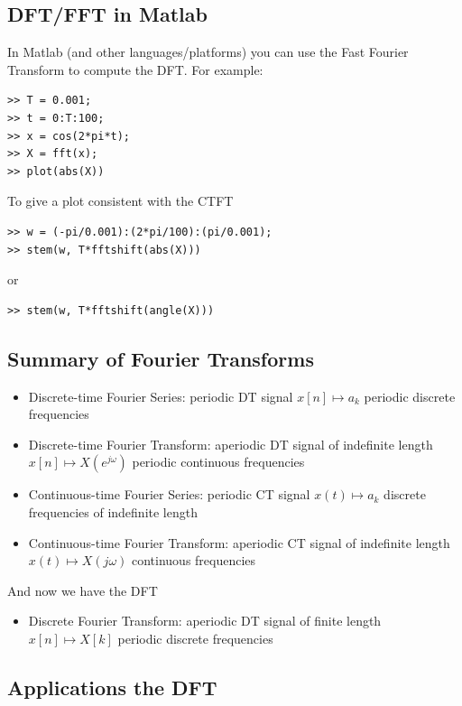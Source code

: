 \subsection{DFT/FFT in Matlab}

In Matlab (and other languages/platforms) you can use the Fast Fourier Transform to compute the DFT. For example:

\begin{verbatim}
>> T = 0.001;
>> t = 0:T:100;
>> x = cos(2*pi*t);
>> X = fft(x);
>> plot(abs(X))
\end{verbatim}
To give a plot consistent with the CTFT
\begin{verbatim}
>> w = (-pi/0.001):(2*pi/100):(pi/0.001);
>> stem(w, T*fftshift(abs(X)))
\end{verbatim}
or
\begin{verbatim}
>> stem(w, T*fftshift(angle(X)))
\end{verbatim}


\subsection{Summary of Fourier Transforms}

\begin{itemize}
\item Discrete-time Fourier Series: periodic DT signal $x[n] \mapsto a_k$ periodic discrete frequencies
\item Discrete-time Fourier Transform: aperiodic DT signal of indefinite length $x[n] \mapsto X(e^{j\omega})$ periodic continuous frequencies
\item Continuous-time Fourier Series: periodic CT signal  $x(t) \mapsto a_k$ discrete frequencies of indefinite length
\item Continuous-time Fourier Transform: aperiodic CT signal of indefinite length  $x(t) \mapsto X(j\omega)$ continuous frequencies 
\end{itemize}

And now we have the DFT
\begin{itemize}
\item Discrete Fourier Transform: aperiodic DT signal of finite length $x[n] \mapsto X[k]$ periodic discrete frequencies
\end{itemize}

\subsection{Applications the DFT}

